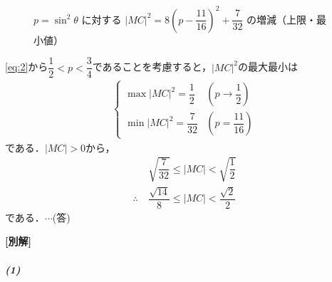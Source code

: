 \documentclass[../../main.tex]{subfiles}
\begin{document}
\begin{figure}[htb]
  \caption{$p = \sin^2\theta$ に対する $|MC|^2 = 8\left(p - \dfrac{11}{16}\right)^2 + \dfrac{7}{32}$ の増減（上限・最小値）}
  \label{fig:mc_squared_graph}
\end{figure}

\cref{eq:2}から$\dfrac{1}{2}<p<\dfrac{3}{4}$であることを考慮すると，$|MC|^2$の最大最小は
\begin{align}
  \begin{cases}
    \max |MC|^2 = \dfrac{1}{2} & \left(p \to \dfrac{1}{2}\right) \\
    \min |MC|^2 = \dfrac{7}{32} & \left(p = \dfrac{11}{16}\right)
  \end{cases}
\end{align}
である．$|MC|>0$から，
\begin{align}
  &\sqrt{\dfrac{7}{32}}\le|MC|<\sqrt{\dfrac{1}{2}} \\
  \therefore \
  &\dfrac{\sqrt{14}}{8}\le|MC|<\dfrac{\sqrt{2}}{2}
\end{align}
である．$\cdots$(答)

{\bf [別解]}

\subparagraph{(1)}
\end{document}
